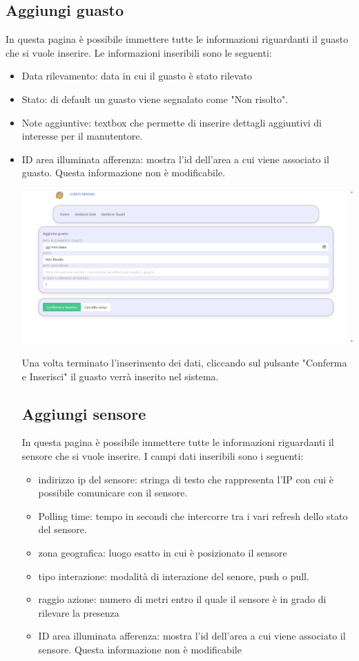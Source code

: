 \documentclass[9pt]{article}
\begin{document}
\subsection{Aggiungi guasto}
In questa pagina è possibile immettere tutte le informazioni riguardanti il guasto che si vuole inserire.
Le informazioni inseribili sono le seguenti:
\begin{itemize}
	\item Data rilevamento: data in cui il guasto è stato rilevato
	\item Stato: di default un guasto viene segnalato come "Non risolto". 
	\item Note aggiuntive: textbox che permette di inserire dettagli aggiuntivi di interesse per il manutentore.
	\item ID area illuminata afferenza: mostra l'id dell'area a cui viene associato il guasto. Questa informazione non è modificabile.

\begin{center}
	\includegraphics[scale=0.3]{Aggiungi_guasto.png}
\end{center}

Una volta terminato l'inserimento dei dati, cliccando sul pulsante "Conferma e Inserisci"
il guasto verrà inserito nel sistema.


\subsection{Aggiungi sensore}
In questa pagina è possibile immettere tutte le informazioni riguardanti il sensore che si vuole inserire.
I campi dati inseribili sono i seguenti:
\begin{itemize}
	\item indirizzo ip del sensore: stringa di testo che rappresenta l'IP con cui è possibile comunicare con il sensore.
	\item Polling time: tempo in secondi che intercorre tra i vari refresh dello stato del sensore.
	\item zona geografica: luogo esatto in cui è posizionato il sensore
	\item tipo interazione: modalità di interazione del senore, push o pull.
	\item raggio azione: numero di metri entro il quale il sensore è in grado di rilevare la presenza
	\item ID area illuminata afferenza: mostra l'id dell'area a cui viene associato il sensore. Questa informazione non è modificabile
\end{itemize}


\end{itemize}
\end{document}
